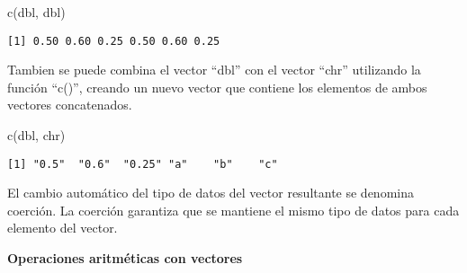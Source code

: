 \documentclass[
  a4paper,
]{article}
\newenvironment{Shaded}{}{}
\newcommand{\FunctionTok}[1]{\textcolor[rgb]{0.44,0.26,0.76}{#1}}
\newcommand{\NormalTok}[1]{\textcolor[rgb]{0.14,0.16,0.18}{#1}}
\begin{document}
\begin{enumerate}
\begin{Shaded}
\begin{Highlighting}[]
\FunctionTok{c}\NormalTok{(dbl, dbl)}
\end{Highlighting}
\end{Shaded}

\begin{verbatim}
[1] 0.50 0.60 0.25 0.50 0.60 0.25
\end{verbatim}

  Tambien se puede combina el vector ``dbl'' con el vector ``chr''
  utilizando la función ``c()'', creando un nuevo vector que contiene
  los elementos de ambos vectores concatenados.

\begin{Shaded}
\begin{Highlighting}[]
\FunctionTok{c}\NormalTok{(dbl, chr)}
\end{Highlighting}
\end{Shaded}

\begin{verbatim}
[1] "0.5"  "0.6"  "0.25" "a"    "b"    "c"   
\end{verbatim}
\end{enumerate}

\begin{tcolorbox}[enhanced jigsaw, coltitle=black, colback=white, colbacktitle=quarto-callout-note-color!10!white, toptitle=1mm, rightrule=.15mm, bottomtitle=1mm, title=\textcolor{quarto-callout-note-color}{\faInfo}\hspace{0.5em}{Nota}, breakable, opacitybacktitle=0.6, toprule=.15mm, leftrule=.75mm, colframe=quarto-callout-note-color-frame, opacityback=0, arc=.35mm, titlerule=0mm, left=2mm, bottomrule=.15mm]

El cambio automático del tipo de datos del vector resultante se denomina
coerción. La coerción garantiza que se mantiene el mismo tipo de datos
para cada elemento del vector.

\end{tcolorbox}

\textbf{Operaciones aritméticas con vectores}
\end{document}
